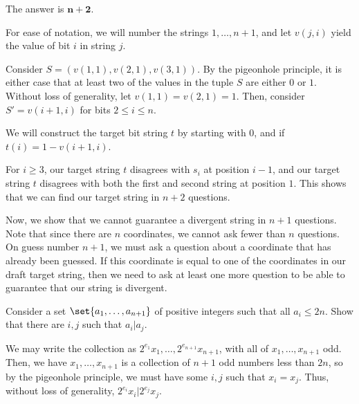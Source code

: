 \documentclass[10pt]{mypackage}
\begin{document}
\begin{solution}
  The answer is $\mathbf{n+2}$.\newline

  For ease of notation, we will number the strings $1,\dots,n+1$, and let $v(j,i)$ yield the value of bit $i$ in string $j$.\newline

  Consider $S = \left(v\left(1,1\right),v\left(2,1\right),v\left(3,1\right)\right)$. By the pigeonhole principle, it is either case that at least two of the values in the tuple $S$ are either $0$ or $1$. Without loss of generality, let $v\left(1,1\right) = v\left(2,1\right) = 1$. Then, consider $S' = v\left(i+1,i\right)$ for bits $2 \leq i \leq n$.\newline

  We will construct the target bit string $t$ by starting with $0$, and if $t\left(i\right) = 1-v\left(i+1,i\right)$.\newline

  For $i\geq 3$, our target string $t$ disagrees with $s_i$ at position $i-1$, and our target string $t$ disagrees with both the first and second string at position $1$. This shows that we can find our target string in $n+2$ questions.\newline

  Now, we show that we cannot guarantee a divergent string in $n+1$ questions. Note that since there are $n$ coordinates, we cannot ask fewer than $n$ questions. On guess number $n+1$, we must ask a question about a coordinate that has already been guessed. If this coordinate is equal to one of the coordinates in our draft target string, then we need to ask at least one more question to be able to guarantee that our string is divergent.
\end{solution}
\begin{problem}
  Consider a set $\set{a_1,\dots,a_{n+1}}$ of positive integers such that all $a_i \leq 2n$. Show that there are $i,j$ such that $a_i | a_j$.
\end{problem}
\begin{solution}
  We may write the collection as $2^{e_1}x_1,\dots, 2^{e_{n+1}}x_{n+1}$, with all of $x_{1},\dots,x_{n+1}$ odd. Then, we have $x_1,\dots,x_{n+1}$ is a collection of $n+1$ odd numbers less than $2n$, so by the pigeonhole principle, we must have some $i,j$ such that $x_i = x_j$. Thus, without loss of generality, $2^{e_i}x_i | 2^{e_j}x_j$.
\end{solution}
\end{document}
